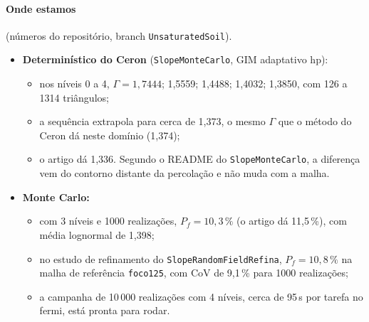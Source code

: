 \paragraph{Onde estamos} (números do repositório, branch \texttt{UnsaturatedSoil}).
\begin{itemize}
  \item \textbf{Determinístico do Ceron} (\texttt{SlopeMonteCarlo}, GIM adaptativo hp):
    \begin{itemize}
      \item nos níveis 0 a 4, $\Gamma = 1{,}7444$; 1,5559; 1,4488; 1,4032; 1,3850, com 126 a 1314 triângulos;
      \item a sequência extrapola para cerca de 1,373, o mesmo $\Gamma$ que o método do Ceron dá neste domínio (1,374);
      \item o artigo dá 1,336. Segundo o README do \texttt{SlopeMonteCarlo}, a diferença vem do contorno distante da
        percolação e não muda com a malha.
    \end{itemize}
  \item \textbf{Monte Carlo:}
    \begin{itemize}
      \item com 3 níveis e 1000 realizações, $P_f = 10{,}3\,\%$ (o artigo dá 11,5\,\%), com média lognormal de 1,398;
      \item no estudo de refinamento do \texttt{SlopeRandomFieldRefina}, $P_f = 10{,}8\,\%$ na malha de referência
        \texttt{foco125}, com CoV de 9,1\,\% para 1000 realizações;
      \item a campanha de 10\,000 realizações com 4 níveis, cerca de 95\,s por tarefa no fermi, está pronta para rodar.
    \end{itemize}
\end{itemize}
